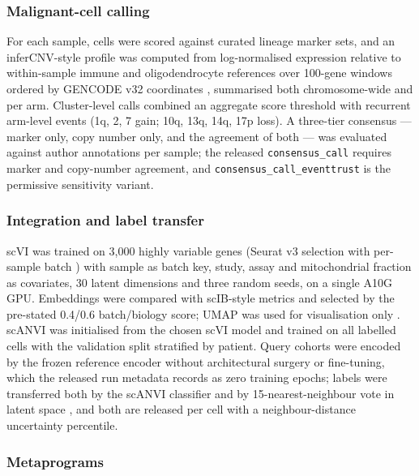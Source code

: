 \documentclass[12pt,a4paper]{article}
\begin{document}
\subsubsection{Malignant-cell calling}

For each sample, cells were scored against curated lineage marker sets, and an inferCNV-style profile was computed from
log-normalised expression relative to within-sample immune and oligodendrocyte references over 100-gene windows ordered
by GENCODE v32 coordinates \citep{frankish2023gencode}, summarised both chromosome-wide and per arm. Cluster-level
calls combined an aggregate score threshold with recurrent arm-level events (1q, 2, 7 gain; 10q, 13q, 14q, 17p loss). A
three-tier consensus --- marker only, copy number only, and the agreement of both --- was evaluated against author
annotations per sample; the released \texttt{consensus\_call} requires marker and copy-number agreement, and
\texttt{consensus\_call\_eventtrust} is the permissive sensitivity variant.

\subsubsection{Integration and label transfer}

scVI \citep{lopez2018deep} was trained on 3,000 highly variable genes (Seurat v3 selection with per-sample batch
\citep{stuart2019comprehensive}) with sample as batch key, study, assay and mitochondrial fraction as covariates, 30
latent dimensions and three random seeds, on a single A10G GPU. Embeddings were compared with scIB-style metrics
\citep{luecken2021benchmarking} and selected by the pre-stated 0.4/0.6 batch/biology score; UMAP was used for
visualisation only \citep{becht2018dimensionality}. scANVI \citep{xu2021probabilistic} was initialised from the chosen
scVI model and trained on all labelled cells with the validation split stratified by patient. Query cohorts were
encoded by the frozen reference encoder without architectural surgery or fine-tuning, which the released run metadata
records as zero training epochs; labels were transferred both by the scANVI classifier and by 15-nearest-neighbour vote
in latent space \citep{lotfollahi2021mapping}, and both are released per cell with a neighbour-distance uncertainty
percentile.

\subsubsection{Metaprograms}
\end{document}
